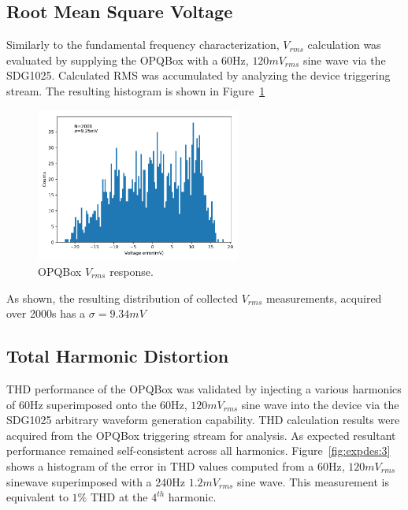 \subsection{Root Mean Square Voltage}
Similarly to the fundamental frequency characterization, $V_{rms}$ calculation was evaluated by supplying the OPQBox with a 60Hz, $120mV_{rms}$ sine wave via the SDG1025.
Calculated RMS was accumulated by analyzing the device triggering stream.
The resulting histogram is shown in Figure~\ref{fig:expdes:2}

\begin{figure}[h]
    \begin{center}
        \includegraphics[width=0.6\textwidth]{img/box_eval/rms_histogram.pdf}
    \end{center}
    \caption{OPQBox $V_{rms}$ response.}
    \label{fig:expdes:2}
\end{figure}

As shown, the resulting distribution of collected $V_{rms}$ measurements, acquired over 2000s has a $\sigma=9.34mV$

\subsection{Total Harmonic Distortion}

THD performance of the OPQBox was validated by injecting a various harmonics of 60Hz superimposed onto the 60Hz, $120mV_{rms}$ sine wave into the device via the SDG1025 arbitrary waveform generation capability.
THD calculation results were acquired from the OPQBox triggering stream for analysis.
As expected resultant performance remained self-consistent across all harmonics.
Figure~\ref{fig:expdes:3} shows a histogram of the error in THD values computed from a 60Hz, $120mV_{rms}$ sinewave superimposed with a 240Hz $1.2mV_{rms}$ sine wave.
This measurement is equivalent to $1\%$ THD at the $4^{th}$ harmonic.

